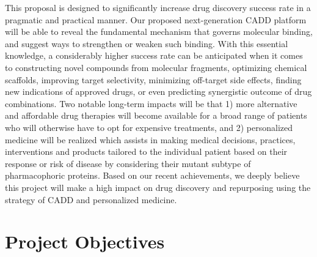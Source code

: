 \documentclass[a4paper,12pt]{article}
\begin{document}
This proposal is designed to significantly increase drug discovery success rate in a pragmatic and practical manner. Our proposed next-generation CADD platform will be able to reveal the fundamental mechanism that governs molecular binding, and suggest ways to strengthen or weaken such binding. With this essential knowledge, a considerably higher success rate can be anticipated when it comes to constructing novel compounds from molecular fragments, optimizing chemical scaffolds, improving target selectivity, minimizing off-target side effects, finding new indications of approved drugs, or even predicting synergistic outcome of drug combinations. Two notable long-term impacts will be that 1) more alternative and affordable drug therapies will become available for a broad range of patients who will otherwise have to opt for expensive treatments, and 2) personalized medicine will be realized which assists in making medical decisions, practices, interventions and products tailored to the individual patient based on their response or risk of disease by considering their mutant subtype of pharmacophoric proteins. Based on our recent achievements, we deeply believe this project will make a high impact on drug discovery and repurposing using the strategy of CADD and personalized medicine.

\section*{Project Objectives}
\end{document}
